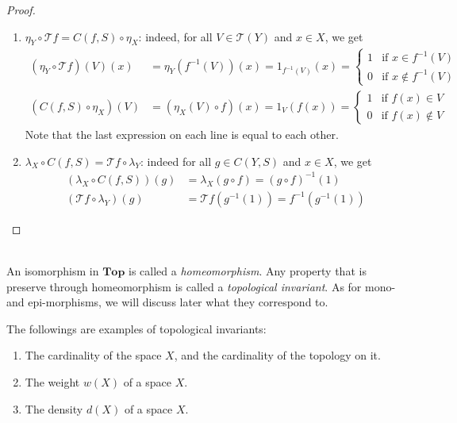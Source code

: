 \documentclass{treatise}
\begin{document}
\begin{proof}
\begin{enumerate}
\begin{enumerate}
        \item $\eta_Y \circ \mathcal{T}f = C(f, S) \circ \eta_X$: indeed, for all $V \in \mathcal{T}(Y)$ and $x \in X$, we get
        \begin{align*}
            (\eta_Y \circ \mathcal{T}f) (V)(x) & = \eta_Y(f^{-1}(V)) (x) = 1_{f^{-1}(V)}(x) = \begin{cases}
            1 & \mbox{if } x \in f^{-1}(V)
            \\
            0 & \mbox{if } x \notin f^{-1}(V)
            \end{cases}
            \\
            (C(f, S) \circ \eta_X) (V) & = (\eta_X (V) \circ f) (x) = 1_V(f(x)) = \begin{cases}
            1 & \mbox{if } f(x) \in V
            \\
            0 & \mbox{if } f(x) \notin V
            \end{cases}
        \end{align*}
        Note that the last expression on each line is equal to each other.
        \item $\lambda_X \circ C(f, S) = \mathcal{T}f \circ \lambda_Y$: indeed for all $g \in C(Y, S)$ and $x \in X$, we get
        \begin{align*}
            (\lambda_X \circ C(f, S)) (g) & = \lambda_X (g \circ f) = (g \circ f)^{-1}(1)
            \\
            (\mathcal{T}f \circ \lambda_Y)(g) & = \mathcal{T}f (g^{-1}(1)) = f^{-1}(g^{-1}(1))
        \end{align*}
    \end{enumerate}
\end{enumerate}
\end{proof}
\ \\
An isomorphism in $\mathbf{Top}$ is called a \emph{homeomorphism}. Any property that is preserve through homeomorphism is called a \emph{topological invariant}. As for mono- and epi-morphisms, we will discuss later what they correspond to.
\begin{remark}
The followings are examples of topological invariants:
\begin{enumerate}
    \item The cardinality of the space $X$, and the cardinality of the topology on it.
    \item The weight $w(X)$ of a space $X$.
    \item The density $d(X)$ of a space $X$.
\end{enumerate}
\end{remark}
\end{document}

